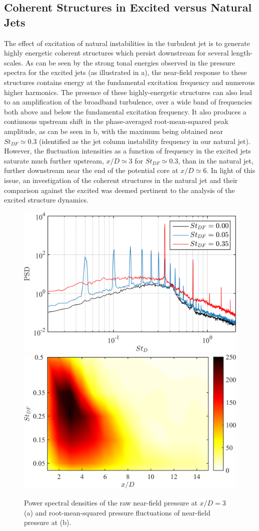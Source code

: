 \subsection{Coherent Structures in Excited versus Natural Jets}
The effect of excitation of natural instabilities in the turbulent jet is to generate highly energetic coherent structures which persist downstream for several length-scales.
As can be seen by the strong tonal energies observed in the pressure spectra for the excited jets (as illustrated in a), the near-field response to these structures contains energy at the fundamental excitation frequency and numerous higher harmonics.
The presence of these highly-energetic structures can also lead to an amplification of the broadband turbulence, over a wide band of frequencies both above and below the fundamental excitation frequency.
It also produces a continuous upstream shift in the phase-averaged root-mean-squared peak amplitude, as can be seen in b, with the maximum being obtained near $St_{DF} \simeq 0.3$ (identified as the jet column instability frequency in our natural jet).
However, the fluctuation intensities as a function of frequency in the excited jets saturate much further upstream, $x/D \simeq 3$ for $St_{DF} \simeq 0.3$,  than in the natural jet, further downstream near the end of the potential core at $x/D \simeq 6$.
In light of this issue, an investigation of the coherent structures in the natural jet and their comparison against the excited was deemed pertinent to the analysis of the excited structure dynamics.
\begin{figure}
	\centering
	\includegraphics[width=0.44\linewidth]{Figures/sect_nearfield_spectra.png}
	\includegraphics[width=0.46\linewidth]{Figures/sect_nearfield_prms.png}
	\caption{Power spectral densities of the raw near-field pressure at $x/D = 3$ (a) and root-mean-squared pressure fluctuations of near-field pressure at (b).}
	\label{fig:sect_nearfield_spectra_prms}
\end{figure}


